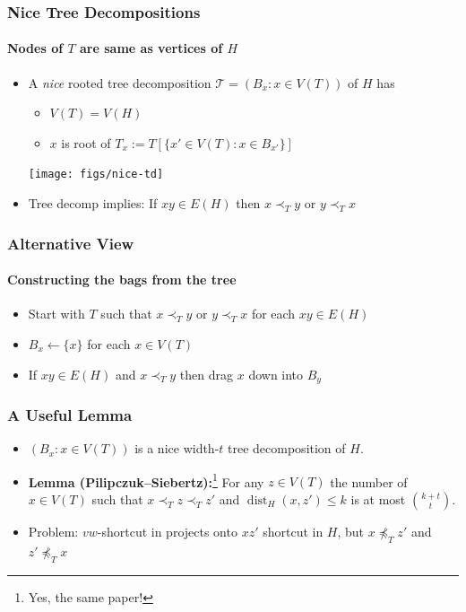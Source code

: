 \documentclass[xcolor=dvipsnames]{beamer}
\begin{document}
\begin{frame}
  \frametitle{Nice Tree Decompositions}
  \framesubtitle{Nodes of $T$ are same as vertices of $H$}

  \begin{itemize}
    \item A \emph{nice} rooted tree decomposition $\mathcal{T}=(B_x:x\in V(T))$ of $H$ has
    \begin{itemize}
      \item $V(T) = V(H)$
      \item $x$ is root of $T_x:=T[\{x'\in V(T):x\in B_{x'}\}]$
    \end{itemize}
    \begin{center}
      \texttt{[image: figs/nice-td]}
    \end{center}
    \item<2-> Tree decomp implies: If $xy\in E(H)$ then $x\prec_T y$ or $y\prec_T x$
  \end{itemize}
\end{frame}


\begin{frame}
  \frametitle{Alternative View}
  \framesubtitle{Constructing the bags from the tree}

  \begin{itemize}
    \item<1-> Start with $T$ such that $x\prec_T y$ or $y\prec_T x$ for each $xy\in E(H)$
    \item<2-> $B_x\gets\{x\}$ for each $x\in V(T)$
    \item<3-> If $xy\in E(H)$ and $x\prec_T y$ then drag $x$ down into $B_y$
  \end{itemize}
  \begin{center}
  \end{center}
\end{frame}


\begin{frame}
  \frametitle{A Useful Lemma}

  \begin{itemize}
    \item $(B_x:x\in V(T))$ is a nice width-$t$ tree decomposition of $H$.

    \item[]\textbf{Lemma (Pilipczuk--Siebertz):}\footnote{Yes, the same paper!} For any $z\in V(T)$ the number of $x\in V(T)$ such that $x\prec_T z\prec_T z'$ and $\mathop{dist}_H(x,z')\le k$ is at most $\binom{k+t}{t}$.
    \begin{center}
    \end{center}
  \end{itemize}
  \begin{itemize}
      \item<4->Problem: $vw$-shortcut in projects onto $xz'$ shortcut in $H$, but $x\not\preceq_T z'$ and $z'\not\preceq_T x$
  \end{itemize}
\end{frame}
\end{document}
